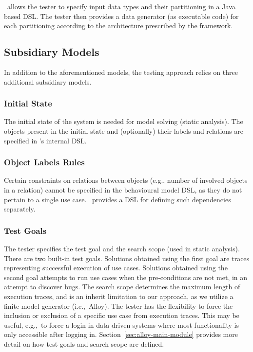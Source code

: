 \this~allows the tester to specify input data types and their partitioning in a Java based DSL. The tester then provides a data generator (as executable code) for each partitioning according to the architecture prescribed by the framework. 

\subsection{Subsidiary Models}
\label{sec:framework-overview-subsidiary}
In addition to the aforementioned models, the testing approach relies on three additional subsidiary models.

\subsubsection{Initial State} 
\label{sec:framework-overview-initial}
The initial state of the system is needed for model solving (static analysis). The objects present in the initial state and (optionally) their labels and relations are specified in \this's internal DSL.

\subsubsection{Object Labels Rules}
\label{sec:framework-overview-rules}
Certain constraints on relations between objects (e.g., number of involved objects in a relation) cannot be specified in the behavioural model DSL, as they do not pertain to a single use case. \this~provides a DSL for defining such dependencies separately.

\subsubsection{Test Goals}
The tester specifies the test goal and the search scope (used in static analysis). There are two built-in test goals. Solutions obtained using the first goal are traces representing successful execution of use cases.
Solutions obtained using the second goal attempts to run use cases when the pre-conditions are not met, in an attempt to discover bugs.
The search scope determines the maximum length of execution traces, and is an inherit limitation to our approach, as we utilize a finite model generator (i.e.,\ Alloy).  The tester has the flexibility to force the inclusion or exclusion of a specific use case from execution traces. This may be useful, e.g.,\ to force a login in data-driven systems where most functionality is only accessible after logging in. Section~\ref{sec:alloy-main-module} provides more detail on how test goals and search scope are defined.


